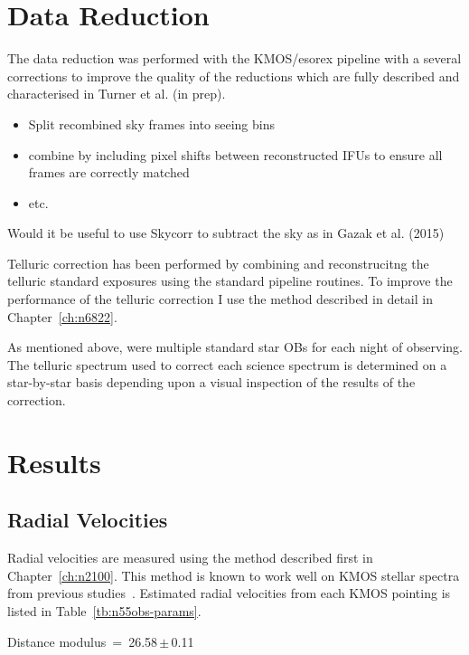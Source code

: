 \section{Data Reduction} %
\label{sec:data_reduction}

The data reduction was performed with the KMOS/esorex pipeline with a several corrections to improve the quality of the reductions which are fully described and characterised in Turner et al. (in prep).

\begin{itemize}
    \item Split recombined sky frames into seeing bins
    \item combine by including pixel shifts between reconstructed IFUs to ensure all frames are correctly matched
    \item etc.
\end{itemize}

Would it be useful to use Skycorr to subtract the sky as in Gazak et al. (2015)

Telluric correction has been performed by combining and reconstrucitng the telluric standard exposures using the standard pipeline routines.
To improve the performance of the telluric correction I use the method described in detail in Chapter~\ref{ch:n6822}.

As mentioned above, were multiple standard star OBs for each night of observing.
The telluric spectrum used to correct each science spectrum is determined on a star-by-star basis depending upon a visual inspection of the results of the correction.


\section{Results} %
\label{sec:results}

\subsection{Radial Velocities} %
\label{sub:rvs}
Radial velocities are measured using the method described first in Chapter~\ref{ch:n2100}.
This method is known to work well on KMOS stellar spectra from previous studies~\cite{2015ApJ...798...23L,2015ApJ...803...14P,2016arXiv160202702P}.
Estimated radial velocities from each KMOS pointing is listed in Table~\ref{tb:n55obs-params}.

Distance modulus~=~26.58\,$\pm$\,0.11~\citep{2011ApJ...738..150T}

